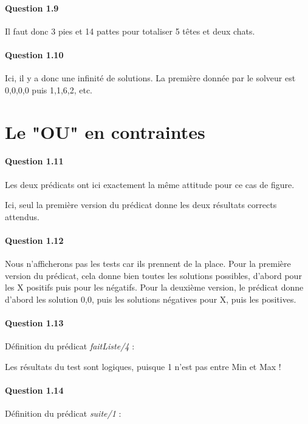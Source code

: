 \documentclass[11pt]{article} %
\begin{document}
\paragraph{Question 1.9}
Il faut donc 3 pies et 14 pattes pour totaliser 5 têtes et deux chats.

\paragraph{Question 1.10}
Ici, il y a donc une infinité de solutions. La première donnée par le solveur est
{0,0,0,0} puis {1,1,6,2}, etc.


\section{Le "OU" en contraintes}
\paragraph{Question 1.11}

 
Les deux prédicats ont ici exactement la même attitude pour ce cas de figure.


Ici, seul la première version du prédicat donne les deux résultats corrects attendus.
\paragraph{Question 1.12}
Nous n'afficherons pas les tests car ils prennent de la place.
Pour la première version du prédicat, cela donne bien toutes les solutions possibles,
d'abord pour les X positifs puis pour les négatifs.
Pour la deuxième version, le prédicat donne d'abord les solution {0,0}, puis les solutions
négatives pour X, puis les positives.

\paragraph{Question 1.13}
Définition du prédicat \textit{faitListe/4} : 

Les résultats du test sont logiques, puisque 1 n'est pas entre Min et Max !

\paragraph{Question 1.14}
Définition du prédicat \textit{suite/1} :

\end{document}
